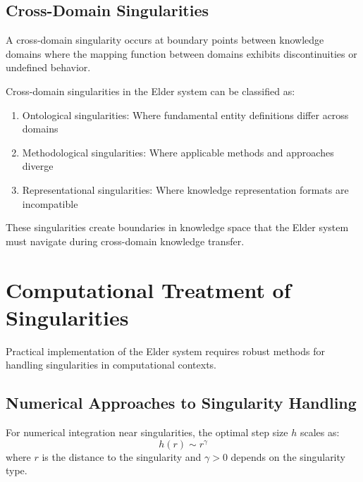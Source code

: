 \begin{definition}
\begin{enumerate}
\subsection{Cross-Domain Singularities}

\begin{definition}
A cross-domain singularity occurs at boundary points between knowledge domains where the mapping function between domains exhibits discontinuities or undefined behavior.
\end{definition}

\begin{theorem}
Cross-domain singularities in the Elder system can be classified as:
\begin{enumerate}
    \item Ontological singularities: Where fundamental entity definitions differ across domains
    \item Methodological singularities: Where applicable methods and approaches diverge
    \item Representational singularities: Where knowledge representation formats are incompatible
\end{enumerate}
\end{theorem}

These singularities create boundaries in knowledge space that the Elder system must navigate during cross-domain knowledge transfer.

\section{Computational Treatment of Singularities}

Practical implementation of the Elder system requires robust methods for handling singularities in computational contexts.

\subsection{Numerical Approaches to Singularity Handling}

\begin{theorem}
For numerical integration near singularities, the optimal step size $h$ scales as:
\begin{equation}
h(r) \sim r^{\gamma}
\end{equation}
where $r$ is the distance to the singularity and $\gamma > 0$ depends on the singularity type.
\end{theorem}


\end{enumerate}
\end{definition}
